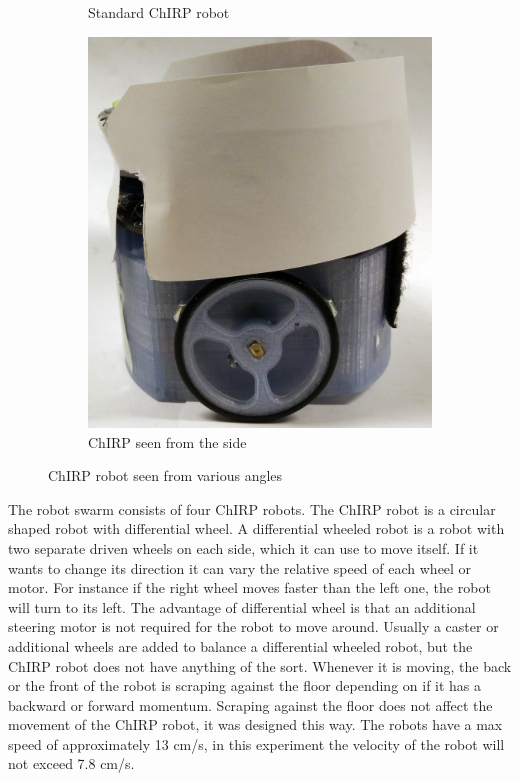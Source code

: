 \begin{figure}[H]
\begin{subfigure}[b]{0.3\textwidth}
        \caption{Standard ChIRP robot}
        \label{fig:robot1}
    \end{subfigure}
    \hfill
    \begin{subfigure}[b]{0.3\textwidth}
        \centering
        \includegraphics[width=\textwidth]{figs/side}
        \caption{ChIRP seen from the side}
        \label{fig:robot3}
    \end{subfigure}
    \caption[ChIRP robot]{ChIRP robot seen from various angles}
    \label{fig:robot}
\end{figure}



The robot swarm consists of four ChIRP robots. The ChIRP robot is a circular shaped robot with differential wheel. A differential wheeled robot is a robot with two separate driven wheels on each side, which it can use to move itself. If it wants to change its direction it can vary the relative speed of each wheel or motor. For instance if the right wheel moves faster than the left one, the robot will turn to its left.
The advantage of differential wheel is that an additional steering motor is not required for the robot to move around. Usually a caster or additional wheels are added to balance a differential wheeled robot, but the ChIRP robot does not have anything of the sort. Whenever it is moving, the back or the front of the robot is scraping against the floor depending on if it has a backward or forward momentum. Scraping against the floor does not affect the movement of the ChIRP robot, it was designed this way. The robots have a max speed of approximately 13 cm/s, in this experiment the velocity of the robot will not exceed 7.8 cm/s. 

